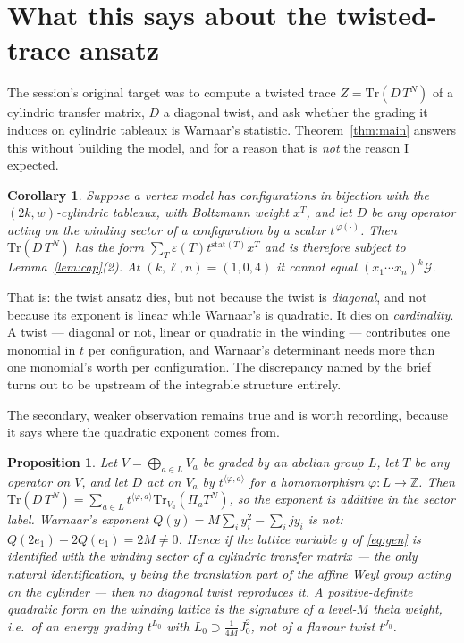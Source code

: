 \documentclass[11pt]{article}
\newtheorem{proposition}[theorem]{Proposition}
\newtheorem{corollary}[theorem]{Corollary}
\theoremstyle{definition}
\newcommand{\Z}{\mathbb{Z}}
\begin{document}
\section{What this says about the twisted-trace ansatz}

The session's original target was to compute a twisted trace
$Z=\mathrm{Tr}(D\,T^{N})$ of a cylindric transfer matrix, $D$ a diagonal twist,
and ask whether the grading it induces on cylindric tableaux is Warnaar's
statistic. Theorem~\ref{thm:main} answers this without building the model, and for a
reason that is \emph{not} the reason I expected.

\begin{corollary}\label{cor:twist}
Suppose a vertex model has configurations in bijection with the
$(2k,w)$-cylindric tableaux, with Boltzmann weight $x^{T}$, and let $D$ be any
operator acting on the winding sector of a configuration by a scalar
$t^{\,\varphi(\cdot)}$. Then $\mathrm{Tr}(D\,T^{N})$ has the form
$\sum_{T}\varepsilon(T)t^{\mathrm{stat}(T)}x^{T}$ and is therefore subject to
Lemma~\ref{lem:cap}(2). At $(k,\ell,n)=(1,0,4)$ it cannot equal
$(x_1\cdots x_n)^{k}\mathcal G$.
\end{corollary}

That is: the twist ansatz dies, but not because the twist is \emph{diagonal},
and not because its exponent is linear while Warnaar's is quadratic. It dies on
\emph{cardinality}. A twist --- diagonal or not, linear or quadratic in the
winding --- contributes one monomial in $t$ per configuration, and Warnaar's
determinant needs more than one monomial's worth per configuration. The
discrepancy named by the brief turns out to be upstream of the integrable
structure entirely.

The secondary, weaker observation remains true and is worth recording, because
it says where the quadratic exponent comes from.

\begin{proposition}\label{prop:lin}
Let $V=\bigoplus_{a\in L}V_a$ be graded by an abelian group $L$, let $T$ be any
operator on $V$, and let $D$ act on $V_a$ by $t^{\langle\varphi,a\rangle}$ for a
homomorphism $\varphi\colon L\to\Z$. Then
$\mathrm{Tr}(D\,T^{N})=\sum_{a\in L}t^{\langle\varphi,a\rangle}\mathrm{Tr}_{V_a}(\Pi_a T^{N})$,
so the exponent is additive in the sector label. Warnaar's exponent
$Q(y)=M\sum_i y_i^{2}-\sum_i jy_i$ is not: $Q(2e_1)-2Q(e_1)=2M\ne0$. Hence if
the lattice variable $y$ of \eqref{eq:gen} is identified with the winding sector
of a cylindric transfer matrix --- the only natural identification, $y$ being
the translation part of the affine Weyl group acting on the cylinder --- then no
diagonal twist reproduces it. A positive-definite quadratic form on the winding
lattice is the signature of a level-$M$ theta weight, i.e.\ of an energy grading
$t^{L_0}$ with $L_0\supset\frac{1}{4M}J_0^{2}$, not of a flavour twist
$t^{J_0}$.
\end{proposition}
\end{document}
